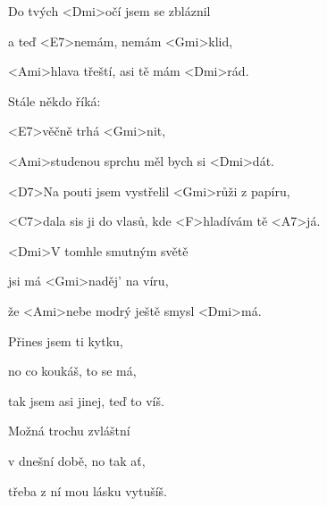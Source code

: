 

\zs
Do tvých <Dmi>očí jsem se zbláznil

a teď <E7>nemám, nemám <Gmi>klid,

<Ami>hlava třeští, asi tě mám <Dmi>rád.

Stále někdo říká: 

<E7>věčně trhá <Gmi>nit,

<Ami>studenou sprchu měl bych si <Dmi>dát.
\ks

\zr
<D7>Na pouti jsem vystřelil <Gmi>růži z papíru,

<C7>dala sis ji do vlasů, kde <F>hladívám tě <A7>já.

<Dmi>V tomhle smutným světě

jsi má <Gmi>naděj' na víru,

že <Ami>nebe modrý ještě smysl <Dmi>má.
\kr

\zs
Přines jsem ti kytku,

no co koukáš, to se má,

tak jsem asi jinej, teď to víš.

Možná trochu zvláštní

v dnešní době, no tak ať,

třeba z ní mou lásku vytušíš.
\ks

\zr \kr
\kp
